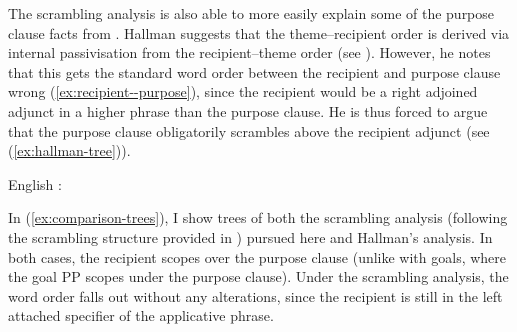 The scrambling analysis is also able to more easily explain some of the purpose clause facts from \citet{Hallman.2015}. Hallman suggests that the theme--recipient order is derived via internal passivisation from the recipient--theme order (see \citet{Larson.1988}). However, he notes that this gets the standard word order between the recipient and purpose clause wrong (\ref{ex:recipient--purpose}), since the recipient would be a right adjoined adjunct in a higher phrase than the purpose clause. He is thus forced to argue that the purpose clause obligatorily scrambles above the recipient adjunct (see (\ref{ex:hallman-tree})).

\begin{exe}
	\ex \label{ex:recipient--purpose} English \citep[ex 25]{Hallman.2015}:\label{ex:en-purpose-order}
	\begin{xlist}
	\end{xlist}
\end{exe}

In (\ref{ex:comparison-trees}), I show trees of both the scrambling analysis (following the scrambling structure provided in \cite{McGinnis.1998}) pursued here and Hallman's analysis. In both cases, the recipient scopes over the purpose clause (unlike with goals, where the goal PP scopes under the purpose clause). Under the scrambling analysis, the word order falls out without any alterations, since the recipient is still in the left attached specifier of the applicative phrase.

